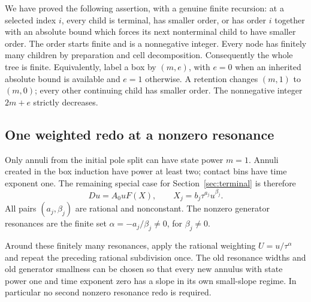 We have proved the following assertion, with a genuine finite recursion:
at a selected index $i$, every child is terminal, has smaller order,
or has order $i$ together with an absolute bound which forces its next
nonterminal child to have smaller order.  The order starts finite and
is a nonnegative integer.  Every node has finitely many children by
preparation and cell decomposition.  Consequently the whole tree is
finite.  Equivalently, label a box by $(m,e)$, with $e=0$ when an
inherited absolute bound is available and $e=1$ otherwise.  A retention
changes $(m,1)$ to $(m,0)$; every other continuing child has smaller
order.  The nonnegative integer $2m+e$ strictly decreases.

\subsection{One weighted redo at a nonzero resonance}

Only annuli from the initial pole split can have state power $m=1$.
Annuli created in the box induction have power at least two; contact
bins have time exponent one.  The remaining special case for
Section~\ref{sec:terminal} is therefore
\[
 Du=A_0uF(X),\qquad X_j=b_j\tau^{a_j}u^{\beta_j}.
\]
All pairs $(a_j,\beta_j)$ are rational and nonconstant.  The nonzero
generator resonances are the finite set
$\alpha=-a_j/\beta_j\ne0$, for $\beta_j\ne0$.

\begin{lemma}
\label{lem:subdivision-resonance-redo}
Around these finitely many resonances, apply the rational weighting
$U=u/\tau^\alpha$ and repeat the preceding rational subdivision once.
The old resonance widths and old generator smallness can be chosen so
that every new annulus with state power one and time exponent zero has
a slope in its own small-slope regime.  In particular no second nonzero
resonance redo is required.
\end{lemma}

